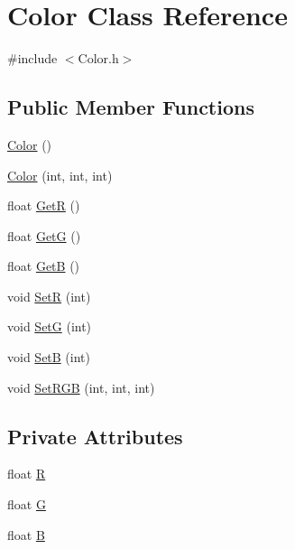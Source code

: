 \hypertarget{classColor}{\section{Color Class Reference}
\label{classColor}
}


{\ttfamily \#include $<$Color.\+h$>$}

\subsection*{Public Member Functions}
\begin{DoxyCompactItemize}
\item 
\hyperlink{classColor_a9a742cbe9f9f4037f5d9f4e81a9b2428}{Color} ()
\item 
\hyperlink{classColor_a2a0f8ff83645300ce27b8195e5ab20f9}{Color} (int, int, int)
\item 
float \hyperlink{classColor_a3405c45524badaaffa479dfbbd7b520a}{Get\+R} ()
\item 
float \hyperlink{classColor_a311967a563b139c6799bd3a2693a0cf1}{Get\+G} ()
\item 
float \hyperlink{classColor_a8e18a509f0ac544261fce3bdeb169597}{Get\+B} ()
\item 
void \hyperlink{classColor_abf2f2cc930b9d98b992ee13effcf5be8}{Set\+R} (int)
\item 
void \hyperlink{classColor_a177015e4bbe93026afa1365ba872a716}{Set\+G} (int)
\item 
void \hyperlink{classColor_a99839b1d46f25e7c98dd7379dd2c9787}{Set\+B} (int)
\item 
void \hyperlink{classColor_afb35c038283f35f38eb02e7405ab1189}{Set\+R\+G\+B} (int, int, int)
\end{DoxyCompactItemize}
\subsection*{Private Attributes}
\begin{DoxyCompactItemize}
\item 
float \hyperlink{classColor_afb8ce8200a490088d415606620149b82}{R}
\item 
float \hyperlink{classColor_a481d25488e6b2669f4d1819f5f15f8b3}{G}
\item 
float \hyperlink{classColor_a2b625cd3df94d1192c6f6aac31fe1f98}{B}
\end{DoxyCompactItemize}



